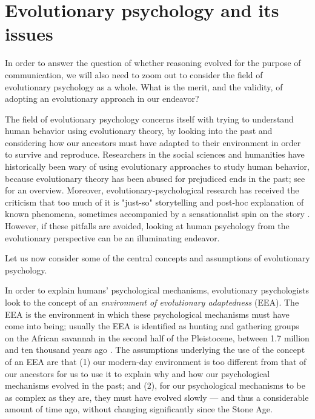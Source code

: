 \section{Evolutionary psychology and its issues}
\label{sec:evol-psych}
In order to answer the question of whether reasoning evolved for the purpose of communication, we will also need to zoom out to consider the field of evolutionary psychology as a whole. What is the merit, and the validity, of adopting an evolutionary approach in our endeavor?

The field of evolutionary psychology concerns itself with trying to understand human behavior using evolutionary theory, by looking into the past and considering how our ancestors must have adapted to their environment in order to survive and reproduce.
Researchers in the social sciences and humanities have historically been wary of using evolutionary approaches to study human behavior, because evolutionary theory has been abused for prejudiced ends in the past; see \citet[pp.~19--20]{LB02} for an overview. Moreover, evolutionary-psychological research has received the criticism that too much of it is "just-so" storytelling and post-hoc explanation of known phenomena, sometimes accompanied by a sensationalist spin on the story \citep{LB02}.
However, if these pitfalls are avoided, looking at human psychology from the evolutionary perspective can be an illuminating endeavor.

Let us now consider some of the central concepts and assumptions of evolutionary psychology.

In order to explain humans' psychological mechanisms, evolutionary psychologists look to the concept of an \emph{environment of evolutionary adaptedness} (EEA). The EEA is the environment in which these psychological mechanisms must have come into being; usually the EEA is identified as hunting and gathering groups on the African savannah in the second half of the Pleistocene, between 1.7 million and ten thousand years ago \citep{LB02} .
The assumptions underlying the use of the concept of an EEA are that (1) our modern-day environment is too different from that of our ancestors for us to use it to explain why and how our psychological mechanisms evolved in the past; and (2), for our psychological mechanisms to be as complex as they are, they must have evolved slowly --- and thus a considerable amount of time ago, without changing significantly since the Stone Age.

